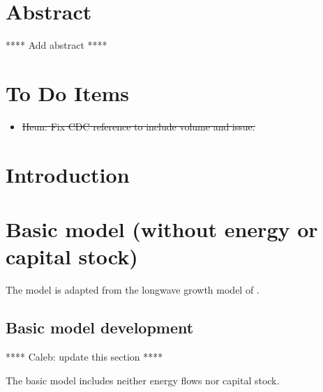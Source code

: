 \documentclass[letterpaper,12pt]{article}
\begin{document}

\section*{Abstract}

**** Add abstract ****

\section*{To Do Items}

\begin{itemize}
\item{\st{Heun: Fix CDC reference to include volume and issue.}}
\end{itemize}




\section{Introduction}
\label{sec:introduction}


\section{Basic model (without energy or capital stock)}
\label{sec:basic_model}

The model is adapted from the longwave growth model of \citet{Jones:2001wn}. 

\subsection{Basic model development}
\label{sec:basic_model_development}

**** Caleb: update this section ****

The basic model includes neither energy flows nor capital stock.
\end{document}
